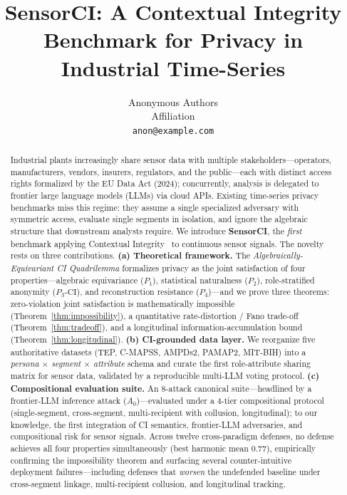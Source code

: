 \documentclass{article}
\title{SensorCI: A Contextual Integrity Benchmark for Privacy in Industrial Time-Series}
\author{%
  Anonymous Authors\\
  Affiliation\\
  \texttt{anon@example.com}
}
\theoremstyle{remark}
\newcommand{\PCI}{P_3\text{-CI}}
\begin{document}
\maketitle

\begin{abstract}
Industrial plants increasingly share sensor data with multiple stakeholders---operators, manufacturers, vendors, insurers, regulators, and the public---each with distinct access rights formalized by the EU Data Act (2024); concurrently, analysis is delegated to frontier large language models (LLMs) via cloud APIs. Existing time-series privacy benchmarks miss this regime: they assume a single specialized adversary with symmetric access, evaluate single segments in isolation, and ignore the algebraic structure that downstream analysts require. We introduce \textbf{SensorCI}, the \emph{first} benchmark applying Contextual Integrity~\cite{nissenbaum2004} to continuous sensor signals. The novelty rests on three contributions. \textbf{(a) Theoretical framework.} The \emph{Algebraically-Equivariant CI Quadrilemma} formalizes privacy as the joint satisfaction of four properties---algebraic equivariance ($P_1$), statistical naturalness ($P_2$), role-stratified anonymity ($\PCI$), and reconstruction resistance ($P_4$)---and we prove three theorems: zero-violation joint satisfaction is mathematically impossible (Theorem~\ref{thm:impossibility}), a quantitative rate-distortion / Fano trade-off (Theorem~\ref{thm:tradeoff}), and a longitudinal information-accumulation bound (Theorem~\ref{thm:longitudinal}). \textbf{(b) CI-grounded data layer.} We reorganize five authoritative datasets (TEP, C-MAPSS, AMPDs2, PAMAP2, MIT-BIH) into a \emph{persona $\times$ segment $\times$ attribute} schema and curate the first role-attribute sharing matrix for sensor data, validated by a reproducible multi-LLM voting protocol. \textbf{(c) Compositional evaluation suite.} An 8-attack canonical suite---headlined by a frontier-LLM inference attack ($A_0$)---evaluated under a 4-tier compositional protocol (single-segment, cross-segment, multi-recipient with collusion, longitudinal); to our knowledge, the first integration of CI semantics, frontier-LLM adversaries, and compositional risk for sensor signals. Across twelve cross-paradigm defenses, no defense achieves all four properties simultaneously (best harmonic mean $0.77$), empirically confirming the impossibility theorem and surfacing several counter-intuitive deployment failures---including defenses that \emph{worsen} the undefended baseline under cross-segment linkage, multi-recipient collusion, and longitudinal tracking.
\end{abstract}
\end{document}
